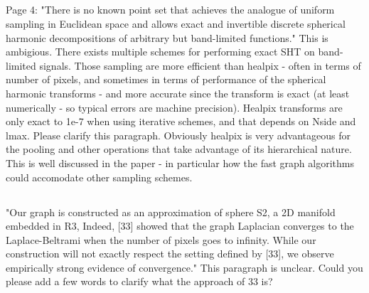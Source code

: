 \documentclass[12pt,a4paper]{article}
\newcommand{\todo}[1]{{\color[rgb]{.6,.1,.6}{TODO: #1}}}
\begin{document}
\subsection{}
\begin{mdframed}[style=comment] 
Page 4: "There is no known point set that achieves the analogue of uniform sampling in Euclidean space and allows exact and invertible discrete spherical harmonic decompositions of arbitrary but band-limited functions." This is ambigious. There exists multiple schemes for performing exact SHT on band-limited signals. Those sampling are more efficient than healpix - often in terms of number of pixels, and sometimes in terms of performance of the spherical harmonic transforms - and more accurate since the transform is exact (at least numerically - so typical errors are machine precision). Healpix transforms are only exact to 1e-7 when using iterative schemes, and that depends on Nside and lmax. Please clarify this paragraph. Obviously healpix is very advantageous for the pooling and other operations that take advantage of its hierarchical nature. This is well discussed in the paper - in particular how the fast graph algorithms could accomodate other sampling schemes.
\end{mdframed}

\todo{We have updated the manuscript to

\begin{mdframed}[style=manuscript] 
blabla
\end{mdframed}
}

\subsection{}
\begin{mdframed}[style=comment] 
"Our graph is constructed as an approximation of sphere S2, a 2D manifold embedded in R3, Indeed, [33] showed that the graph Laplacian converges to the Laplace-Beltrami when the number of pixels goes to infinity. While our construction will not exactly respect the setting defined by [33], we observe empirically strong evidence of convergence." This paragraph is unclear. Could you please add a few words to clarify what the approach of 33 is? 
\end{mdframed}

\todo{We added

\begin{mdframed}[style=manuscript] 
blabla
\end{mdframed}}
\end{document}
